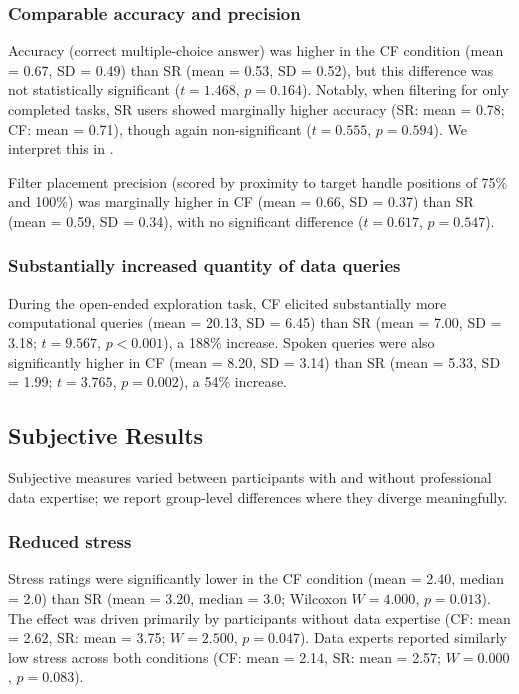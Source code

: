 \documentclass[12pt]{cmuthesis}
\begin{document}
\subsubsection{Comparable accuracy and precision}

Accuracy (correct multiple-choice answer) was higher in the CF condition (mean = 0.67, SD = 0.49) than SR (mean = 0.53, SD = 0.52), but this difference was not statistically significant ($t = 1.468$, $p = 0.164$). Notably, when filtering for only completed tasks, SR users showed marginally higher accuracy (SR: mean = 0.78; CF: mean = 0.71), though again non-significant ($t = 0.555$, $p = 0.594$). We interpret this in .

Filter placement precision (scored by proximity to target handle positions of 75\% and 100\%) was marginally higher in CF (mean = 0.66, SD = 0.37) than SR (mean = 0.59, SD = 0.34), with no significant difference ($t = 0.617$, $p = 0.547$).

\subsubsection{Substantially increased quantity of data queries}

During the open-ended exploration task, CF elicited substantially more computational queries (mean = 20.13, SD = 6.45) than SR (mean = 7.00, SD = 3.18; $t = 9.567$, $p < 0.001$), a 188\% increase. Spoken queries were also significantly higher in CF (mean = 8.20, SD = 3.14) than SR (mean = 5.33, SD = 1.99; $t = 3.765$, $p = 0.002$), a 54\% increase. 


\subsection{Subjective Results}


Subjective measures varied between participants with and without professional data expertise; we report group-level differences where they diverge meaningfully.

\subsubsection{Reduced stress}

Stress ratings were significantly lower in the CF condition (mean = 2.40, median = 2.0) than SR (mean = 3.20, median = 3.0; Wilcoxon $W = 4.000$, $p = 0.013$). The effect was driven primarily by participants without data expertise (CF: mean = 2.62, SR: mean = 3.75; $W = 2.500$, $p = 0.047$). Data experts reported similarly low stress across both conditions (CF: mean = 2.14, SR: mean = 2.57; $W = 0.000$, $p = 0.083$).
\end{document}
